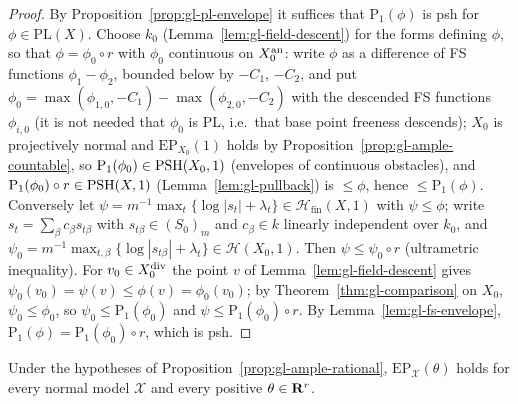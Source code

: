 \begin{proof}
By Proposition~\ref{prop:gl-pl-envelope} it suffices that $\mathrm P_1(\phi)$ is psh for $\phi\in\mathrm{PL}(X)$. Choose $k_0$ (Lemma~\ref{lem:gl-field-descent}) for the
forms defining $\phi$, so that $\phi=\phi_0\circ r$ with $\phi_0$ continuous on $X_0^{\mathrm{an}}$: write $\phi$ as a difference of FS functions $\phi_1-\phi_2$, bounded
below by $-C_1$, $-C_2$, and put $\phi_0=\max(\phi_{1,0},-C_1)-\max(\phi_{2,0},-C_2)$ with the descended FS functions $\phi_{i,0}$ (it is not
needed that $\phi_0$ is PL, i.e.\ that base point freeness descends); $X_0$ is projectively normal and $\mathrm{EP}_{X_0}(1)$ holds by
Proposition~\ref{prop:gl-ample-countable}, so $\mathrm P_1(\phi_0)\in\operatorname{PSH}(X_0,1)$ (envelopes of continuous obstacles), and $\mathrm P_1(\phi_0)\circ r\in\operatorname{PSH}(X,1)$
(Lemma~\ref{lem:gl-pullback}) is $\le\phi$, hence $\le\mathrm P_1(\phi)$. Conversely let $\psi=m^{-1}\max_t\{\log|s_t|+\lambda_t\}\in\mathcal H_{\mathrm{fin}}(X,1)$ with
$\psi\le\phi$; write $s_t=\sum_\beta c_\beta s_{t\beta}$ with $s_{t\beta}\in(S_0)_m$ and $c_\beta\in k$ linearly independent over $k_0$, and
$\psi_0=m^{-1}\max_{t,\beta}\{\log|s_{t\beta}|+\lambda_t\}\in\mathcal H(X_0,1)$. Then $\psi\le\psi_0\circ r$ (ultrametric inequality). For $v_0\in X_0^{\mathrm{div}}$ the point $v$ of
Lemma~\ref{lem:gl-field-descent} gives $\psi_0(v_0)=\psi(v)\le\phi(v)=\phi_0(v_0)$; by Theorem~\ref{thm:gl-comparison} on $X_0$, $\psi_0\le\phi_0$, so
$\psi_0\le\mathrm P_1(\phi_0)$ and $\psi\le\mathrm P_1(\phi_0)\circ r$. By Lemma~\ref{lem:gl-fs-envelope}, $\mathrm P_1(\phi)=\mathrm P_1(\phi_0)\circ r$, which is psh.
\end{proof}

\begin{theorem}\label{thm:gl-normal-ample-ep}
\leanok
{}
Under the hypotheses of Proposition~\ref{prop:gl-ample-rational}, $\mathrm{EP}_{\mathcal X}(\theta)$ holds for every normal model $\mathcal X$ and every positive
$\theta\in\mathbf{R}^r$.
\end{theorem}

